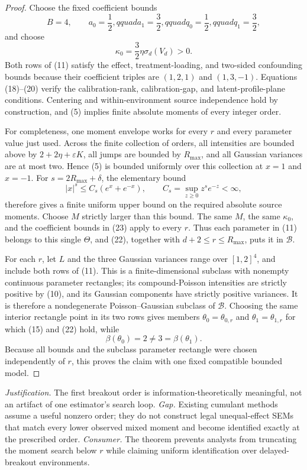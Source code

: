\documentclass{article}
\begin{document}
\begin{proof}
Choose the fixed coefficient bounds
\[
 B=4,\qquad a_0=\frac12,qquad a_1=\frac32,qquad
 q_0=\frac12,qquad q_1=\frac32,
 \tag{23}
\]
and choose
\[
 \kappa_0=\frac32\eta\sigma_d(V_d)>0.
 \tag{24}
\]
Both rows of (11) satisfy the effect, treatment-loading, and two-sided confounding bounds because their coefficient triples are \((1,2,1)\) and \((1,3,-1)\).  Equations (18)--(20) verify the calibration-rank, calibration-gap, and latent-profile-plane conditions.  Centering and within-environment source independence hold by construction, and (5) implies finite absolute moments of every integer order.

For completeness, one moment envelope works for every \(r\) and every parameter value just used.  Across the finite collection of orders, all intensities are bounded above by \(2+2\eta+\varepsilon K\), all jumps are bounded by \(R_{\max}\), and all Gaussian variances are at most two.  Hence (5) is bounded uniformly over this collection at \(x=1\) and \(x=-1\).  For \(s=2R_{\max}+\delta\), the elementary bound
\[
 |x|^s\leq C_s(e^x+e^{-x}),
 \qquad
 C_s=\sup_{z\geq0}z^se^{-z}<\infty,
 \tag{25}
\]
therefore gives a finite uniform upper bound on the required absolute source moments.  Choose \(M\) strictly larger than this bound.  The same \(M\), the same \(\kappa_0\), and the coefficient bounds in (23) apply to every \(r\).  Thus each parameter in (11) belongs to this single \(\Theta\), and (22), together with \(d+2\leq r\leq R_{\max}\), puts it in \(\mathcal B\).

For each \(r\), let \(L\) and the three Gaussian variances range over \([1,2]^4\), and include both rows of (11).  This is a finite-dimensional subclass with nonempty continuous parameter rectangles; its compound-Poisson intensities are strictly positive by (10), and its Gaussian components have strictly positive variances.  It is therefore a nondegenerate Poisson--Gaussian subclass of \(\mathcal B\).  Choosing the same interior rectangle point in its two rows gives members \(\theta_0=\theta_{0,r}\) and \(\theta_1=\theta_{1,r}\) for which (15) and (22) hold, while
\[
 \beta(\theta_0)=2\neq3=\beta(\theta_1).
\]
Because all bounds and the subclass parameter rectangle were chosen independently of \(r\), this proves the claim with one fixed compatible bounded model.
\end{proof}
\par\smallskip\noindent \textit{Justification.} The first breakout order is information-theoretically meaningful, not an artifact of one estimator's search loop. \textit{Gap.} Existing cumulant methods assume a useful nonzero order; they do not construct legal unequal-effect SEMs that match every lower observed mixed moment and become identified exactly at the prescribed order. \textit{Consumer.} The theorem prevents analysts from truncating the moment search below \(r\) while claiming uniform identification over delayed-breakout environments.
\end{document}
